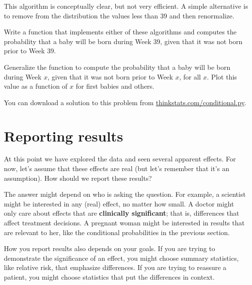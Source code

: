 \documentclass[12pt]{book}
\begin{document}
This algorithm is conceptually clear, but not very efficient.
A simple alternative is to remove from the distribution the values
less than 39 and then renormalize.

\begin{exercise}
Write a function that implements either of these algorithms and
computes the probability that a baby will be born during Week 39,
given that it was not born prior to Week 39.

Generalize the function to compute the
probability that a baby will be born during Week $x$, given that
it was not born prior to Week $x$, for all $x$.
Plot this value as a function of $x$ for first babies and others.

You can download a solution to this problem from
\url{thinkstats.com/conditional.py}.


\end{exercise}


\section{Reporting results}

At this point we have explored the data and seen several apparent
effects.  For now, let's assume that these effects are real (but let's
remember that it's an assumption).  How should we report these
results?

The answer might depend on who is asking the question.  For example, a
scientist might be interested in any (real) effect, no matter how
small.  A doctor might only care about effects that are {\bf
  clinically significant}; that is, differences that affect treatment
decisions.  A pregnant woman might be interested in results that are
relevant to her, like the conditional probabilities in the previous
section.


How you report results also depends on your goals.  If you are
trying to demonstrate the significance of an effect, you might choose
summary statistics, like relative risk, that emphasize differences.
If you are trying to reassure a patient, you might choose statistics
that put the differences in context.
\end{document}
